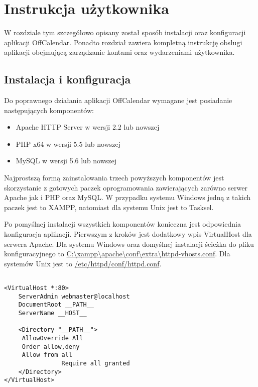 \chapter{Instrukcja użytkownika}
\label{cha:instrUzytk}

W rozdziale tym szczegółowo opisany został sposób instalacji oraz konfiguracji aplikacji OffCalendar. Ponadto rozdział zawiera kompletną instrukcję obsługi aplikacji obejmującą zarządzanie kontami oraz wydarzeniami użytkownika.

\section{Instalacja i konfiguracja}
\label{sec:instKonf}

Do poprawnego działania aplikacji OffCalendar wymagane jest posiadanie następujących komponentów:

\begin{itemize}
\item Apache HTTP Server w wersji 2.2 lub nowszej
\item PHP x64 w wersji 5.5 lub nowszej
\item MySQL w wersji 5.6 lub nowszej
\end{itemize}

Najprostszą formą zainstalowania trzech powyższych komponentów jest skorzystanie z gotowych paczek oprogramowania zawierających zarówno serwer Apache jak i PHP oraz MySQL. W przypadku systemu Windows jedną z takich paczek jest to XAMPP, natomiast dla systemu Unix jest to Tasksel.

Po pomyślnej instalacji wszystkich komponentów konieczna jest odpowiednia konfiguracja aplikacji. Pierwszym z kroków jest dodatkowy wpis VirtualHost dla serwera Apache. Dla systemu Windows oraz domyślnej instalacji ścieżka do pliku konfiguracyjnego to \url{C:\xampp\apache\conf\extra\httpd-vhosts.conf}. Dla systemów Unix jest to \url{/etc/httpd/conf/httpd.conf}.

\begin{lstlisting}[caption=Konfiguracja serwera Apache., label=amb, captionpos=b]

<VirtualHost *:80>
    ServerAdmin webmaster@localhost
    DocumentRoot __PATH__
    ServerName __HOST__

    <Directory "__PATH__">
   	 AllowOverride All
   	 Order allow,deny
   	 Allow from all
            	Require all granted
    </Directory>
</VirtualHost>

\end{lstlisting}

